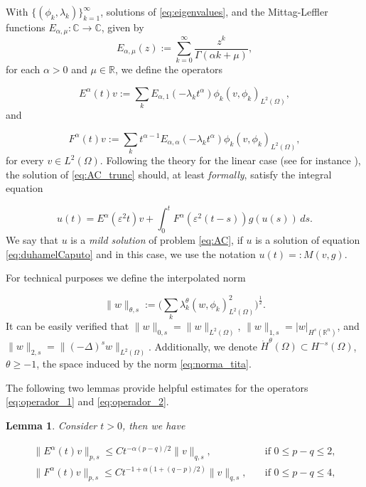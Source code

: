 \documentclass{amsart}
\newcommand{\rn}{{\mathbb{R}^n}}
\newcommand{\ele}{L^2(\Omega)}
\newcommand{\W}{\Omega}
\newcommand{\eps}{\varepsilon}
\newcommand{\hmsT}{H^{-s} (\W)}
\newcommand{\fmonio}{g}
\def\R{{\mathbb {R}}}
\newtheorem{lemma}[theorem]{Lemma}
\theoremstyle{remark}
\theoremstyle{definition}
\numberwithin{equation}{section}
\begin{document}
 

With $\{(\phi_k, \lambda_k) \}_{k=1}^\infty$, solutions of  \eqref{eq:eigenvalues}, and the Mittag-Leffler functions  $E_{\alpha,\mu} \colon \mathbb{C} \to \mathbb{C}$,
 given by 
  \begin{equation}
\label{eq:Mittag-Leffler}
E_{\alpha,\mu}(z) := \sum_{k=0}^\infty \frac{z^k}{\Gamma(\alpha k + \mu)},
 \end{equation}
 for each $\alpha > 0$ and $\mu \in \R$, we define the operators   

\begin{equation}
\label{eq:operador_1}
E^{\alpha}(t)v := \sum_{k} E_{\alpha,1}(-\lambda_k t^{\alpha}) \phi_k (v,\phi_k)_{\ele},
\end{equation}
and

\begin{equation}
\label{eq:operador_2}
F^{\alpha}(t)v := \sum_{k} t^{\alpha-1}E_{\alpha,\alpha}(-\lambda_k t^{\alpha}) \phi_k (v,\phi_k)_{\ele},
\end{equation}
for every $v \in \ele$. Following the theory for the linear case (see for instance \cite{parabolico}), the solution of \eqref{eq:AC_trunc} should, at least \emph{formally}, satisfy the integral equation 
 
\begin{equation}
u(t) = E^{\alpha}(\eps^2 t)v + \int^{t}_0 F^{\alpha}(\eps^2(t-s) )\fmonio(u(s))\,ds.
\label{eq:duhamelCaputo}
\end{equation}
We say that $u$ is a \emph{mild solution} of problem \eqref{eq:AC}, if $u$ is a solution of equation \eqref{eq:duhamelCaputo} and in this case, we use the notation $u(t) =: M(v,\fmonio)$.  

For technical purposes we define the interpolated norm

\begin{equation}
\label{eq:norma_tita}
\|w\|_{\theta,s} := \Big( \sum_{k} \lambda^{\theta}_k (w,\phi_k)^2_{\ele} \Big)^{\frac{1}{2}}. 
\end{equation} 
It can be easily verified that $\|w\|_{0,s} = \|w\|_{\ele}$, $\|w\|_{1,s} = |w|_{H^s(\rn)}$, and $\|w\|_{2,s} = \|(-\Delta)^{s} w\|_{\ele}$. Additionally, we denote $\dot{H}^{\theta}(\W) \subset \hmsT$, $\theta \geq -1$, the space induced by the norm \eqref{eq:norma_tita}.  

The following two lemmas provide helpful estimates for the operators \eqref{eq:operador_1} and \eqref{eq:operador_2}.

\begin{lemma}
\label{estimacionSemigrupo}
Consider $t>0$, then we have

\begin{align}
 \|E^{\alpha}(t)v\|_{p,s}  \leq Ct^{-\alpha(p-q)/2}\|v\|_{q,s}, & \quad \text{if } 0 \leq p - q \leq 2, \label{eq:semigEst1} \\
 \|F^{\alpha}(t)v\|_{p,s}  \leq Ct^{-1 + \alpha(1 + (q-p)/2)}\|v\|_{q,s}, & \quad \text{if } 0 \leq p - q \leq 4, \label{eq:semigEst2}
\end{align}


\end{lemma}
\end{document}
